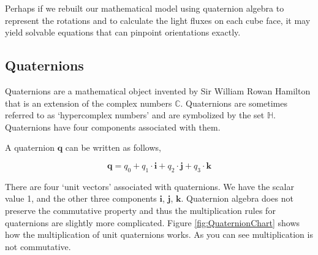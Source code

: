 \documentclass[10pt, letterpaper]{article}
\begin{document}
Perhaps if we rebuilt our mathematical model using quaternion algebra to represent the rotations and to calculate the light fluxes on each cube face, it may yield solvable equations that can pinpoint orientations exactly.

\subsection{Quaternions}

Quaternions are a mathematical object invented by Sir William Rowan Hamilton that is an extension of the complex numbers $\mathbb{C}$. Quaternions are sometimes referred to as `hypercomplex numbers' and are symbolized by the set $\mathbb{H}$. Quaternions have four components associated with them.

A quaternion $\mathbf{q}$ can be written as follows,

\begin{equation*}
    \mathbf{q} = q_{0} + q_{1} \cdot \mathbf{i} + q_{2} \cdot \mathbf{j} + q_{3} \cdot \mathbf{k}
\end{equation*}

There are four `unit vectors' associated with quaternions. We have the scalar value 1, and the other three components $\mathbf{i}$, $\mathbf{j}$, $\mathbf{k}$. Quaternion algebra does not preserve the commutative property and thus the multiplication rules for quaternions are slightly more complicated. Figure \ref{fig:QuaternionChart} shows how the multiplication of unit quaternions works. As you can see multiplication is not commutative.
\end{document}
